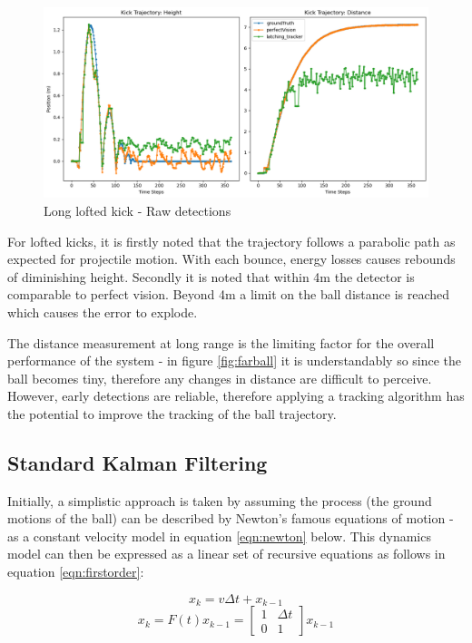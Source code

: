 \documentclass[a4paper,twoside,12pt]{report}
\begin{document}
\begin{figure}[h!]
\begin{center}
\includegraphics[width=14cm]{images/raw_loft_long.png}
\caption{Long lofted kick - Raw detections}
\label{fig:rawloftlong}
\end{center}
\end{figure}

For lofted kicks, it is firstly noted that the trajectory follows a parabolic path as expected for projectile motion. With each bounce, energy losses causes rebounds of diminishing height. Secondly it is noted that within 4m the detector is comparable to perfect vision. Beyond 4m a limit on the ball distance is reached which causes the error to explode. 

The distance measurement at long range is the limiting factor for the overall performance of the system - in figure \ref{fig:farball} it is understandably so since the ball becomes tiny, therefore any changes in distance are difficult to perceive. However, early detections are reliable, therefore applying a tracking algorithm has the potential to improve the tracking of the ball trajectory. 

\subsection{Standard Kalman Filtering}

Initially, a simplistic approach is taken by assuming the process (the ground motions of the ball) can be described by Newton's famous equations of motion - as a constant velocity model in equation \ref{eqn:newton} below. This dynamics model can then be expressed as a linear set of recursive equations as follows in equation \ref{eqn:firstorder}:

\begin{equation} 
x_k=v\Delta t + x_{k-1}
\label{eqn:newton}
\end{equation}
\begin{equation} 
x_k
=
F(t)x_{k-1}
=
\begin{bmatrix}
    1 & \Delta t \\
    0 & 1 
\end{bmatrix}
x_{k-1}
\label{eqn:firstorder}
\end{equation}
\end{document}
